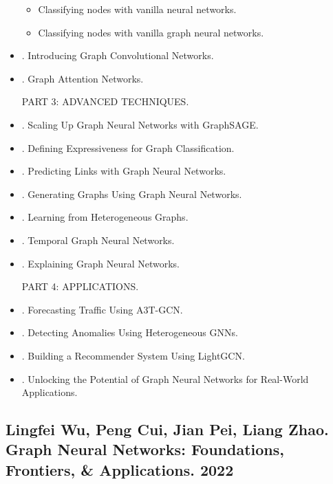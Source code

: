 \documentclass{article}
\begin{document}
\begin{itemize}
\begin{itemize}
        \item {\sf Classifying nodes with vanilla neural networks.}
        \item {\sf Classifying nodes with vanilla graph neural networks.}
    \end{itemize}
    \item {. Introducing Graph Convolutional Networks.}
    \item {. Graph Attention Networks.}

    PART 3: ADVANCED TECHNIQUES.
    \item {. Scaling Up Graph Neural Networks with GraphSAGE.}
    \item {. Defining Expressiveness for Graph Classification.}
    \item {. Predicting Links with Graph Neural Networks.}
    \item {. Generating Graphs Using Graph Neural Networks.}
    \item {. Learning from Heterogeneous Graphs.}
    \item {. Temporal Graph Neural Networks.}
    \item {. Explaining Graph Neural Networks.}

    PART 4: APPLICATIONS.
    \item {. Forecasting Traffic Using A3T-GCN.}
    \item {. Detecting Anomalies Using Heterogeneous GNNs.}
    \item {. Building a Recommender System Using LightGCN.}
    \item {. Unlocking the Potential of Graph Neural Networks for Real-World Applications.}
\end{itemize}


\subsection{{\sc Lingfei Wu, Peng Cui, Jian Pei, Liang Zhao}. Graph Neural Networks: Foundations, Frontiers, \& Applications. 2022}
\end{document}
